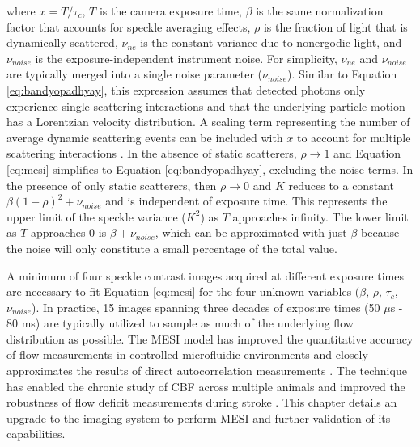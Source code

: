 \noindent where $x = T/\tau_c$, $T$ is the camera exposure time, $\beta$ is the same normalization factor that accounts for speckle averaging effects, $\rho$ is the fraction of light that is dynamically scattered, $\nu_{ne}$ is the constant variance due to nonergodic light, and $\nu_{noise}$ is the exposure-independent instrument noise. For simplicity, $\nu_{ne}$ and $\nu_{noise}$ are typically merged into a single noise parameter ($\nu_{noise}$). Similar to Equation \ref{eq:bandyopadhyay}, this expression assumes that detected photons only experience single scattering interactions and that the underlying particle motion has a Lorentzian velocity distribution. A scaling term representing the number of average dynamic scattering events can be included with $x$ to account for multiple scattering interactions \cite{Kazmi:2015du}. In the absence of static scatterers, $\rho \to 1$ and Equation \ref{eq:mesi} simplifies to Equation \ref{eq:bandyopadhyay}, excluding the noise terms. In the presence of only static scatterers, then $\rho \to 0$ and $K$ reduces to a constant $\beta(1 - \rho)^2 + \nu_{noise}$ and is independent of exposure time. This represents the upper limit of the speckle variance ($K^2$) as $T$ approaches infinity. The lower limit as $T$ approaches 0 is $\beta + \nu_{noise}$, which can be approximated with just $\beta$ because the noise will only constitute a small percentage of the total value.

A minimum of four speckle contrast images acquired at different exposure times are necessary to fit Equation \ref{eq:mesi} for the four unknown variables ($\beta$, $\rho$, $\tau_c$, $\nu_{noise}$). In practice, 15 images spanning three decades of exposure times (50 $\mu$s - 80 ms) are typically utilized to sample as much of the underlying flow distribution as possible. The MESI model has improved the quantitative accuracy of flow measurements in controlled microfluidic environments \cite{Parthasarathy:2008el, Kazmi:2015du} and closely approximates the results of direct autocorrelation measurements \cite{Kazmi:2015ji}. The technique has enabled the chronic study of CBF across multiple animals and improved the robustness of flow deficit measurements during stroke \cite{Parthasarathy:2010vo, Kazmi:2013hp, Schrandt:2015gu}. This chapter details an upgrade to the imaging system to perform MESI and further validation of its capabilities.



